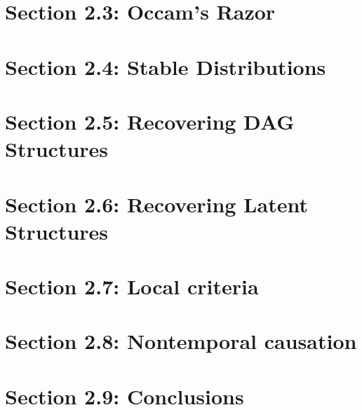 \documentclass[oneside]{book}
\begin{document}


\section{Section 2.3: Occam's Razor}



\section{Section 2.4: Stable Distributions}



\section{Section 2.5: Recovering DAG Structures}



\section{Section 2.6: Recovering Latent Structures}



\section{Section 2.7: Local criteria}



\section{Section 2.8: Nontemporal causation}



\section{Section 2.9: Conclusions}


\end{document}
